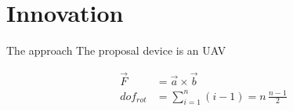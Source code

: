 

\section{Innovation} %
\label{sec:innovation}
 
 The approach 
The proposal device is an UAV \cite{ICAO}


\begin{align}
  \vec F &= \vec a \times \vec b\\
  {dof}_{rot} &= \sum_{i=1}^n (i-1) = n\, \frac{n-1}{2}
\end{align}



